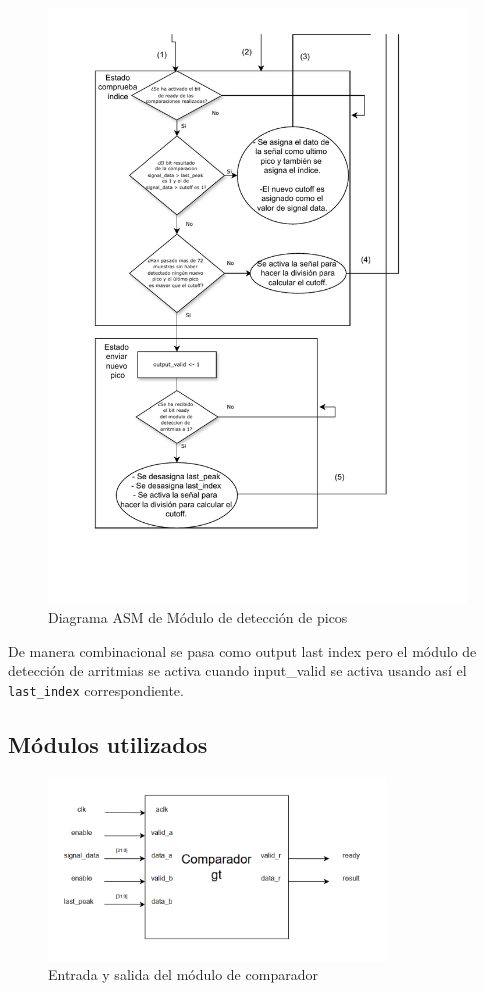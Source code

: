 \begin{figure}[h!]
    \centering
    \includegraphics[width=0.99\textwidth]{./Images/img_implementacion_hw/Diagramaasmpicos2.pdf}
    \caption{Diagrama ASM de Módulo de detección de picos}
    \label{fig:Diagramaasmpicos2}
\end{figure} 
\FloatBarrier
De manera combinacional se pasa como output last index pero el módulo de detección de arritmias se activa cuando input\_valid
se activa usando así el \texttt{last\_index} correspondiente.

\subsection{Módulos utilizados}

\begin{figure}[h!]
    \centering
    \includegraphics[width=0.8\textwidth]{./Images/img_implementacion_hw/comparadorgt.png}
    \caption{Entrada y salida del módulo de comparador}
    \label{fig:comparadorgt}
\end{figure}

